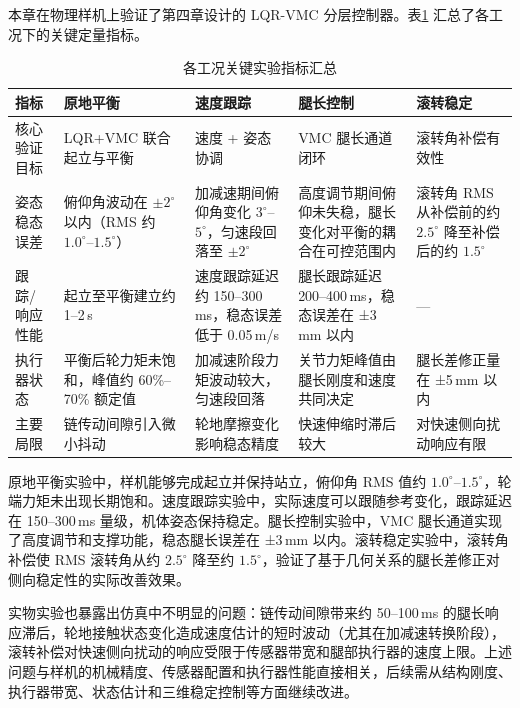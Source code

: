 本章在物理样机上验证了第四章设计的 LQR-VMC 分层控制器。表\ref{tab:experiment-summary} 汇总了各工况下的关键定量指标。

\begin{table}[H]
  \centering
  \caption{各工况关键实验指标汇总}
  \label{tab:experiment-summary}
  \small
  \begin{tabular}{p{2.4cm}p{2.6cm}p{2.6cm}p{2.6cm}p{2.6cm}}
    \toprule
    指标 & 原地平衡 & 速度跟踪 & 腿长控制 & 滚转稳定 \\
    \midrule
    核心验证目标 & LQR+VMC 联合起立与平衡 & 速度 + 姿态协调 & VMC 腿长通道闭环 & 滚转角补偿有效性 \\
    \hline
    姿态稳态误差 & 俯仰角波动在 $\pm 2^\circ$ 以内（RMS 约 $1.0^\circ$--$1.5^\circ$） & 加减速期间俯仰角变化 $3^\circ$--$5^\circ$，匀速段回落至 $\pm 2^\circ$ & 高度调节期间俯仰未失稳，腿长变化对平衡的耦合在可控范围内 & 滚转角 RMS 从补偿前的约 $2.5^\circ$ 降至补偿后的约 $1.5^\circ$ \\
    \hline
    跟踪/响应性能 & 起立至平衡建立约 1--2\,s & 速度跟踪延迟约 150--300\,ms，稳态误差低于 0.05\,m/s & 腿长跟踪延迟 200--400\,ms，稳态误差在 ±3\,mm 以内 & — \\
    \hline
    执行器状态 & 平衡后轮力矩未饱和，峰值约 60\%--70\% 额定值 & 加减速阶段力矩波动较大，匀速段回落 & 关节力矩峰值由腿长刚度和速度共同决定 & 腿长差修正量在 ±5\,mm 以内 \\
    \hline
    主要局限 & 链传动间隙引入微小抖动 & 轮地摩擦变化影响稳态精度 & 快速伸缩时滞后较大 & 对快速侧向扰动响应有限 \\
    \bottomrule
  \end{tabular}
\end{table}

原地平衡实验中，样机能够完成起立并保持站立，俯仰角 RMS 值约 $1.0^\circ$--$1.5^\circ$，轮端力矩未出现长期饱和。速度跟踪实验中，实际速度可以跟随参考变化，跟踪延迟在 150--300\,ms 量级，机体姿态保持稳定。腿长控制实验中，VMC 腿长通道实现了高度调节和支撑功能，稳态腿长误差在 ±3\,mm 以内。滚转稳定实验中，滚转角补偿使 RMS 滚转角从约 $2.5^\circ$ 降至约 $1.5^\circ$，验证了基于几何关系的腿长差修正对侧向稳定性的实际改善效果。

实物实验也暴露出仿真中不明显的问题：链传动间隙带来约 50--100\,ms 的腿长响应滞后，轮地接触状态变化造成速度估计的短时波动（尤其在加减速转换阶段），滚转补偿对快速侧向扰动的响应受限于传感器带宽和腿部执行器的速度上限。上述问题与样机的机械精度、传感器配置和执行器性能直接相关，后续需从结构刚度、执行器带宽、状态估计和三维稳定控制等方面继续改进。
